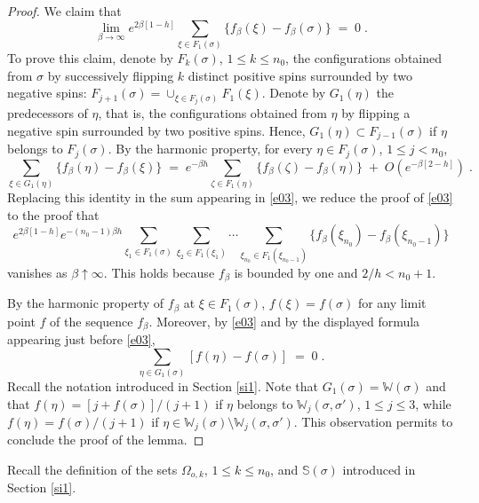 \documentclass[reqno]{amsart}
\begin{document}
\begin{proof}
We claim that
\begin{equation}
\label{e03}
\lim_{\beta\to\infty} e^{2\beta[1-h]} \sum_{\xi \in F_1(\sigma)}
\{f_\beta(\xi) - f_\beta(\sigma)\} \;=\; 0\;.
\end{equation}
To prove this claim, denote by $F_k(\sigma)$, $1\le k\le n_0$, the
configurations obtained from $\sigma$ by successively flipping $k$
distinct positive spins surrounded by two negative spins:
$F_{j+1}(\sigma) = \cup_{\xi\in F_{j}(\sigma)} F_1(\xi)$. Denote by
$G_1(\eta)$ the predecessors of $\eta$, that is, the configurations
obtained from $\eta$ by flipping a negative spin surrounded by two
positive spins. Hence, $G_1(\eta) \subset F_{j-1}(\sigma)$ if $\eta$
belongs to $F_j(\sigma)$. By the harmonic property, for every $\eta\in
F_j(\sigma)$, $1\le j< n_0$,
\begin{equation*}
\sum_{\xi \in G_1(\eta)} \{f_\beta(\eta) - f_\beta(\xi)\} \;=\;
e^{-\beta h} \sum_{\zeta \in F_1(\eta)} 
\{f_\beta(\zeta) - f_\beta(\eta)\} \;+\;
O(e^{-\beta [2-h]})\;.
\end{equation*}
Replacing this identity in the sum appearing in \eqref{e03}, we reduce
the proof of \eqref{e03} to the proof that
\begin{equation*}
e^{2\beta[1-h]} e^{-(n_0-1)\beta h} 
\sum_{\xi_1 \in F_1(\sigma)}
\sum_{\xi_2 \in F_1(\xi_1)} \cdots \sum_{\xi_{n_0} \in F_1(\xi_{n_0-1})}
\{f_\beta(\xi_{n_0}) - f_\beta(\xi_{n_0-1})\} 
\end{equation*}
vanishes as $\beta\uparrow\infty$. This holds because $f_\beta$ is
bounded by one and $2/h < n_0+1$.

By the harmonic property of $f_\beta$ at $\xi\in F_1(\sigma)$, $f(\xi)
= f(\sigma)$ for any limit point $f$ of the sequence
$f_\beta$. Moreover, by \eqref{e03} and by the displayed formula
appearing just before \eqref{e03},
\begin{equation*}
\sum_{\eta \in G_1(\sigma)} [f (\eta)-f (\sigma)] \;=\; 0\;.
\end{equation*}
Recall the notation introduced in Section \ref{si1}.  Note that
$G_1(\sigma) = {{\mathbb W}}(\sigma)$ and that $f(\eta) = [j+f(\sigma)]/(j+1)$
if $\eta$ belongs to ${{\mathbb W}}_j(\sigma, \sigma')$, $1\le j\le 3$, while
$f(\eta) = f(\sigma)/(j+1)$ if $\eta\in {{\mathbb W}}_j(\sigma) \setminus {{\mathbb W}}_j(\sigma, \sigma')$. This observation permits to conclude the proof
of the lemma.
\end{proof} 

Recall the definition of the sets $\Omega_{o,k}$, $1\le k\le n_0$, and
${{\mathbb S}}(\sigma)$ introduced in Section \ref{si1}.
\end{document}

